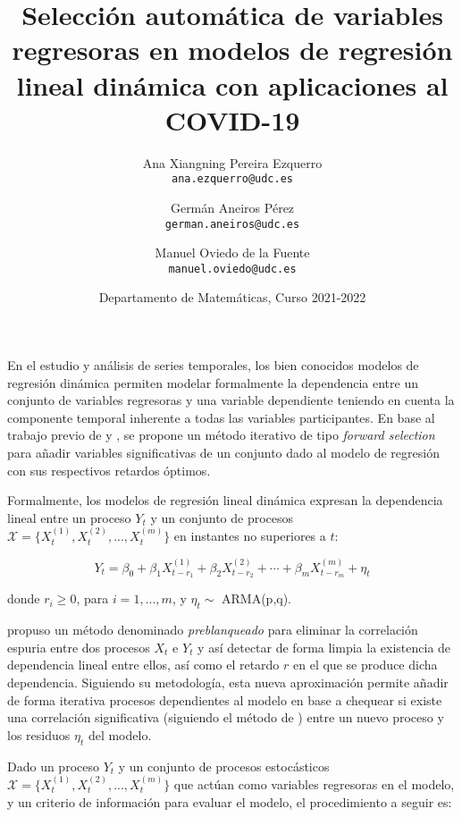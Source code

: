 \documentclass[12pt, a4paper, twoside]{article}
\title{\textbf{Selección automática de variables regresoras en modelos de regresión lineal dinámica con aplicaciones al COVID-19}}
\author{Ana Xiangning Pereira Ezquerro \\ \texttt{ana.ezquerro@udc.es} \and 
        Germán Aneiros Pérez \\ \texttt{german.aneiros@udc.es} \and 
        Manuel Oviedo de la Fuente \\ \texttt{manuel.oviedo@udc.es}}
\date{Departamento de Matemáticas, Curso 2021-2022}
\begin{document}
\maketitle



En el estudio y análisis de series temporales, los bien conocidos modelos de regresión dinámica permiten modelar formalmente la dependencia entre un conjunto de variables regresoras y una variable dependiente teniendo en cuenta la componente temporal inherente a todas las variables participantes. En base al trabajo previo de \cite{cryer2008time} y \cite{hyndman2018forecasting}, se propone un método iterativo de tipo \textit{forward selection} para añadir variables significativas de un conjunto dado al modelo de regresión con sus respectivos retardos óptimos.

Formalmente, los modelos de regresión lineal dinámica expresan la dependencia lineal entre un proceso $Y_t$ y un conjunto de procesos $\mathcal{X}=\{ X_t^{(1)}, X_t^{(2)}, ..., X_t^{(m)}\}$ en instantes no superiores a $t$:

\[ Y_t = \beta_0 + \beta_1 X^{(1)}_{t-r_1} + \beta_2 X^{(2)}_{t-r_2} + \cdots +  \beta_m  X^{(m)}_{t-r_m} + \eta_t \]

donde $r_i \geq 0$, para $i=1,...,m$, y $\eta_t \sim$ ARMA(p,q).

\cite{cryer2008time} propuso un método denominado \textit{preblanqueado} para eliminar la correlación espuria entre dos procesos $X_t$ e $Y_t$ y así detectar de forma limpia la existencia de dependencia lineal entre ellos, así como el retardo $r$ en el que se produce dicha dependencia. Siguiendo su metodología, esta nueva aproximación permite añadir de forma iterativa procesos dependientes al modelo en base a chequear si existe una correlación significativa (siguiendo el método de \cite{cryer2008time}) entre un nuevo proceso y los residuos $\eta_t$ del modelo.

Dado un proceso $Y_t$ y un conjunto de procesos estocásticos $\mathcal{X}=\{ X_t^{(1)}, X_t^{(2)}, ..., X_t^{(m)}\}$ que actúan como variables regresoras en el modelo, y un criterio de información para evaluar el modelo, el procedimiento a seguir es:
\end{document}
